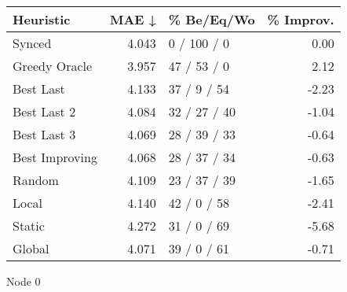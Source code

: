 \begin{tabular}{lrlr}
\toprule
\textbf{Heuristic} & \textbf{MAE ↓} & \textbf{\% Be/Eq/Wo} & \textbf{\% Improv.} \\
\midrule
            Synced &          4.043 &          0 / 100 / 0 &                0.00 \\
     Greedy Oracle &          3.957 &          47 / 53 / 0 &                2.12 \\
         Best Last &          4.133 &          37 / 9 / 54 &               -2.23 \\
       Best Last 2 &          4.084 &         32 / 27 / 40 &               -1.04 \\
       Best Last 3 &          4.069 &         28 / 39 / 33 &               -0.64 \\
    Best Improving &          4.068 &         28 / 37 / 34 &               -0.63 \\
            Random &          4.109 &         23 / 37 / 39 &               -1.65 \\
             Local &          4.140 &          42 / 0 / 58 &               -2.41 \\
            Static &          4.272 &          31 / 0 / 69 &               -5.68 \\
            Global &          4.071 &          39 / 0 / 61 &               -0.71 \\
\bottomrule
\end{tabular}
\caption{Node 0}
\label{tab:hr_non_lr05_le2_bs4_0}
